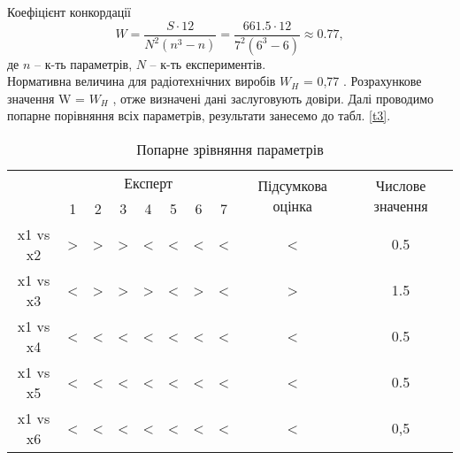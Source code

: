 \documentclass[a4paper,14pt]{extreport}
\begin{document}
     Коефіцієнт конкордації 
     \[ W = \dfrac{S\cdot 12}{N^2 (n^3-n)} = \dfrac{661.5\cdot 12}{7^2 (6^3-6)} \approx 0.77, \]
     де $n$ -- к-ть параметрів, $N$ -- к-ть експериментів.\\ 
     Нормативна величина для радіотехнічних виробів $W_H$ =  0,77 . Розрахункове
    значення W  = $W_H$ , отже визначені дані заслуговують довіри.
    Далі проводимо попарне порівняння всіх параметрів, результати занесемо до
    табл. \ref{t3}.

    \begin{table}[h!]
    \caption{Попарне зрівняння параметрів}
    \begin{center}
    \begin{tabular}{|c|ccccccc|c|c|}
    \hline
    \multirow{2}{*}{} & \multicolumn{7}{c|}{Експерт}                                                                                                                            & \multirow{2}{*}{Підсумкова оцінка} & \multirow{2}{*}{Числове значення} \\ \cline{2-8}
                      & \multicolumn{1}{c|}{1} & \multicolumn{1}{c|}{2} & \multicolumn{1}{c|}{3} & \multicolumn{1}{c|}{4} & \multicolumn{1}{c|}{5} & \multicolumn{1}{c|}{6} & 7 &                                    &                                   \\ \hline
    x1 vs  x2         & \multicolumn{1}{c|}{>} & \multicolumn{1}{c|}{>} & \multicolumn{1}{c|}{>} & \multicolumn{1}{c|}{<} & \multicolumn{1}{c|}{<} & \multicolumn{1}{c|}{<} & < & <                                  & 0.5                               \\ \hline
    x1 vs x3          & \multicolumn{1}{c|}{<} & \multicolumn{1}{c|}{>} & \multicolumn{1}{c|}{>} & \multicolumn{1}{c|}{>} & \multicolumn{1}{c|}{<} & \multicolumn{1}{c|}{>} & < & >                                  & 1.5                               \\ \hline
    x1 vs x4          & \multicolumn{1}{c|}{<} & \multicolumn{1}{c|}{<} & \multicolumn{1}{c|}{<} & \multicolumn{1}{c|}{<} & \multicolumn{1}{c|}{<} & \multicolumn{1}{c|}{<} & < & <                                  & 0.5                               \\ \hline
    x1 vs x5          & \multicolumn{1}{c|}{<} & \multicolumn{1}{c|}{<} & \multicolumn{1}{c|}{<} & \multicolumn{1}{c|}{<} & \multicolumn{1}{c|}{<} & \multicolumn{1}{c|}{<} & < & <                                  & 0.5                               \\ \hline
    x1 vs x6          & \multicolumn{1}{c|}{<} & \multicolumn{1}{c|}{<} & \multicolumn{1}{c|}{<} & \multicolumn{1}{c|}{<} & \multicolumn{1}{c|}{<} & \multicolumn{1}{c|}{<} & < & <                                  & 0,5                               \\ \hline

\end{tabular}
\end{center}
\end{table}
\end{document}
